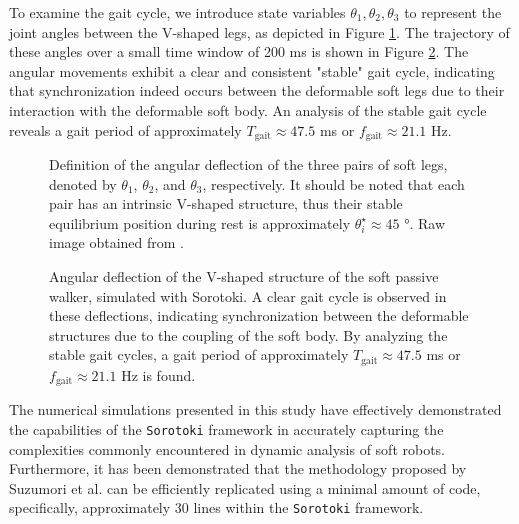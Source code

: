To examine the gait cycle, we introduce state variables $\theta_1, \theta_2, \theta_3$ to represent the joint angles between the V-shaped legs, as depicted in Figure \ref{fig:C5:passivewalker_states}. The trajectory of these angles over a small time window of 200 \si{\milli \second} is shown in Figure \ref{fig:C5:passivewalker_gait}. The angular movements exhibit a clear and consistent "stable" gait cycle, indicating that synchronization indeed occurs between the deformable soft legs due to their interaction with the deformable soft body. An analysis of the stable gait cycle reveals a gait period of approximately $T_{\textrm{gait}} \approx 47.5$ \si{\milli \second} or $f_{\textrm{gait}} \approx 21.1$ \si{\hertz}.
%
\begin{figure}[!t]
    \centering
    \def\svgwidth{0.65\textwidth}
    
    \caption{Definition of the angular deflection of the three pairs of soft legs, denoted by $\theta_1$, $\theta_2$, and $\theta_3$, respectively. It should be noted that each pair has an intrinsic V-shaped structure, thus their stable equilibrium position during rest is approximately $\theta_i^\star \approx 45$ \si{\degree}. Raw image obtained from \cite{Suzumori2008Sep}.}
    \label{fig:C5:passivewalker_states}
    \vspace{-2mm}
    \end{figure}
    \begin{figure}[!t]
        
        
        \caption{Angular deflection of the V-shaped structure of the soft passive walker, simulated with Sorotoki. A clear gait cycle is observed in these deflections, indicating synchronization between the deformable structures due to the coupling of the soft body. By analyzing the stable gait cycles, a gait period of approximately $T_{\textrm{gait}} \approx 47.5$ \si{\milli \second} or $f_{\textrm{gait}} \approx 21.1$ \si{\hertz} is found.}
        \label{fig:C5:passivewalker_gait}
        \vspace{-6mm}
    \end{figure}
%
The numerical simulations presented in this study have effectively demonstrated the capabilities of the  \texttt{Sorotoki} framework in accurately capturing the complexities commonly encountered in dynamic analysis of soft robots. Furthermore, it has been demonstrated that the methodology proposed by Suzumori et al. \cite{Suzumori2008Sep} can be efficiently replicated using a minimal amount of code, specifically, approximately 30 lines within the \texttt{Sorotoki} framework.

